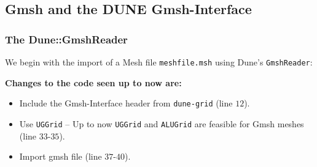 \subsection{Gmsh and the DUNE Gmsh-Interface}

\begin{frame}
  \frametitle{The Dune::GmshReader}
  We begin with the import of a Mesh file \lstinline!meshfile.msh! using Dune's
  \lstinline!GmshReader!:
  
      \textbf{Changes to the code seen up to now are:}
  \begin{itemize}
    \item Include the Gmsh-Interface header from \lstinline!dune-grid! (line
      $12$).
    \item Use \lstinline!UGGrid! -- Up to now \lstinline!UGGrid! and
      \lstinline!ALUGrid! are feasible for Gmsh meshes (line $33$-$35$).
    \item Import gmsh file (line $37$-$40$).
  \end{itemize}
\end{frame}

